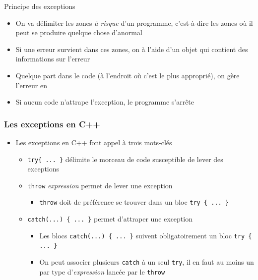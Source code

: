 \begin{frame}{Principe des exceptions}
\begin{itemize}
\item On va délimiter les zones \textit{à risque} d'un programme, c'est-à-dire les zones où il peut se produire quelque chose d'anormal
\item Si une erreur survient dans ces zones, on  à l'aide d'un objet qui contient des informations sur l'erreur
\item Quelque part dans le code (à l'endroit où c'est le plus approprié), on gère l'erreur en  
\item Si aucun code n'attrape l'exception, le programme s'arrête
\end{itemize}
\end{frame}

\begin{frame}[fragile]\frametitle{Les exceptions en C++}
\begin{itemize}
\item Les exceptions en C++ font appel à trois mots-clés
\begin{itemize}
\item \verb|try{ ... }| délimite le morceau de code susceptible de lever des exceptions
\item \verb|throw| \textit{expression} permet de lever une exception
\begin{itemize}
\item \verb|throw| doit de préférence se trouver dans un bloc \verb|try { ... }|
\end{itemize}
\item \verb|catch(...) { ... }| permet d'attraper une exception
\begin{itemize}
\item Les blocs \verb|catch(...) { ... }| suivent obligatoirement un bloc \verb|try { ... }|
\item On peut associer plusieurs \verb|catch| à un seul \verb|try|, il en faut au moins un par type d'\textit{expression} lancée par le \verb|throw|
\end{itemize}
\end{itemize}
\end{itemize}
\end{frame}

